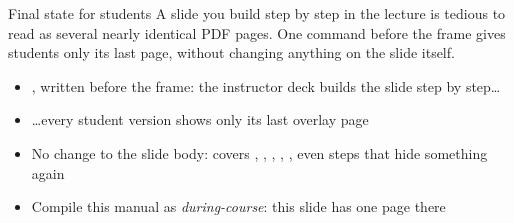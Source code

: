 
\SMFinalStateForStudents
\begin{standardframe}{Final state for students}
	\small
	A slide you build step by step in the lecture is tedious to read as several
	nearly identical PDF pages. One command before the frame gives students only
	its last page, without changing anything on the slide itself.
	\par\medskip
	\begin{itemize}
		\item {}, written before the frame: the instructor deck builds the slide step by step\ldots
		\item<2-> \ldots every student version shows only its last overlay page
		\item<3-> No change to the slide body: covers , , , , , even steps that hide something again
		\item<3-> Compile this manual as \emph{during-course}: this slide has one page there
	\end{itemize}
\end{standardframe}
